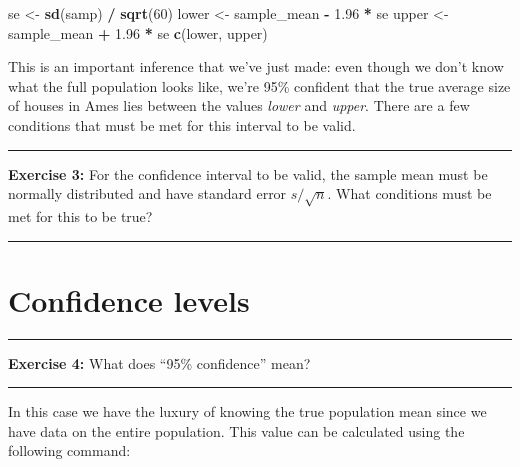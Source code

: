 \documentclass[]{book}
\newenvironment{Shaded}{\begin{snugshade}}{\end{snugshade}}
\newcommand{\KeywordTok}[1]{\textcolor[rgb]{0.13,0.29,0.53}{\textbf{#1}}}
\newcommand{\DecValTok}[1]{\textcolor[rgb]{0.00,0.00,0.81}{#1}}
\newcommand{\FloatTok}[1]{\textcolor[rgb]{0.00,0.00,0.81}{#1}}
\newcommand{\StringTok}[1]{\textcolor[rgb]{0.31,0.60,0.02}{#1}}
\newcommand{\OperatorTok}[1]{\textcolor[rgb]{0.81,0.36,0.00}{\textbf{#1}}}
\newcommand{\NormalTok}[1]{#1}
\theoremstyle{definition}
\theoremstyle{definition}
\theoremstyle{definition}
\theoremstyle{remark}
\begin{document}
\begin{Shaded}
\begin{Highlighting}[]
\NormalTok{se <-}\StringTok{ }\KeywordTok{sd}\NormalTok{(samp) }\OperatorTok{/}\StringTok{ }\KeywordTok{sqrt}\NormalTok{(}\DecValTok{60}\NormalTok{)}
\NormalTok{lower <-}\StringTok{ }\NormalTok{sample_mean }\OperatorTok{-}\StringTok{ }\FloatTok{1.96} \OperatorTok{*}\StringTok{ }\NormalTok{se}
\NormalTok{upper <-}\StringTok{ }\NormalTok{sample_mean }\OperatorTok{+}\StringTok{ }\FloatTok{1.96} \OperatorTok{*}\StringTok{ }\NormalTok{se}
\KeywordTok{c}\NormalTok{(lower, upper)}
\end{Highlighting}
\end{Shaded}

This is an important inference that we've just made: even though we
don't know what the full population looks like, we're 95\% confident
that the true average size of houses in Ames lies between the values
\emph{lower} and \emph{upper}. There are a few conditions that must be
met for this interval to be valid.

\begin{center}\rule{0.5\linewidth}{\linethickness}\end{center}

\textbf{Exercise 3:} For the confidence interval to be valid, the sample
mean must be normally distributed and have standard error
\(s / \sqrt{n}.\) What conditions must be met for this to be true?

\begin{center}\rule{0.5\linewidth}{\linethickness}\end{center}

\section{Confidence levels}\label{confidence-levels}

\begin{center}\rule{0.5\linewidth}{\linethickness}\end{center}

\textbf{Exercise 4:} What does ``95\% confidence'' mean?

\begin{center}\rule{0.5\linewidth}{\linethickness}\end{center}

In this case we have the luxury of knowing the true population mean
since we have data on the entire population. This value can be
calculated using the following command:
\end{document}
